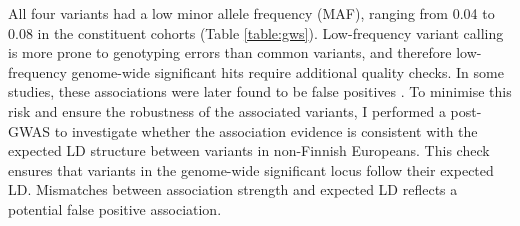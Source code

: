 All four variants had a low minor allele frequency (MAF), ranging from  0.04 to 0.08 in the constituent cohorts (Table \ref{table:gws}). Low-frequency variant calling is more prone to genotyping errors than common variants, and therefore low-frequency genome-wide significant hits require additional quality checks. In some studies, these associations were later found to be false positives \cite{Tabangin2009-gs,Ayers2011-bc}. To minimise this risk and ensure the robustness of the associated variants, I performed a post-GWAS to investigate whether the association evidence is consistent with the expected LD structure between variants in non-Finnish Europeans. This check ensures that variants in the genome-wide significant locus follow their expected LD. Mismatches between association strength and expected LD reflects a potential false positive association.\\
